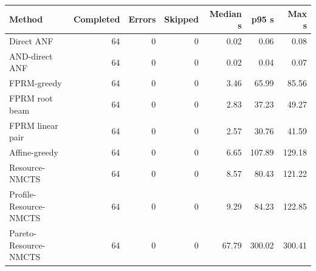 \begin{tabular}{lrrrrrr}
\toprule
Method & Completed & Errors & Skipped & Median s & p95 s & Max s \\
\midrule
Direct ANF & 64 & 0 & 0 & 0.02 & 0.06 & 0.08 \\
AND-direct ANF & 64 & 0 & 0 & 0.02 & 0.04 & 0.07 \\
FPRM-greedy & 64 & 0 & 0 & 3.46 & 65.99 & 85.56 \\
FPRM root beam & 64 & 0 & 0 & 2.83 & 37.23 & 49.27 \\
FPRM linear pair & 64 & 0 & 0 & 2.57 & 30.76 & 41.59 \\
Affine-greedy & 64 & 0 & 0 & 6.65 & 107.89 & 129.18 \\
Resource-NMCTS & 64 & 0 & 0 & 8.57 & 80.43 & 121.22 \\
Profile-Resource-NMCTS & 64 & 0 & 0 & 9.29 & 84.23 & 122.85 \\
Pareto-Resource-NMCTS & 64 & 0 & 0 & 67.79 & 300.02 & 300.41 \\
\bottomrule
\end{tabular}
